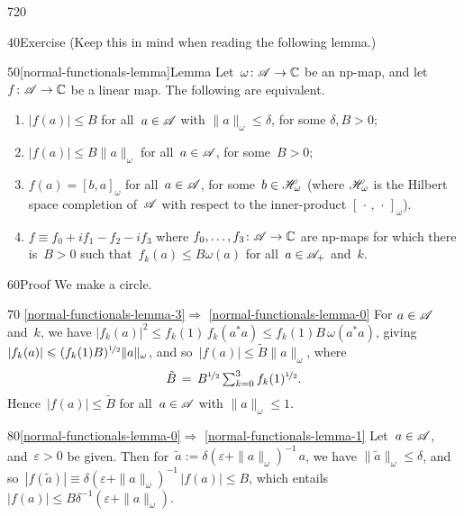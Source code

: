\begin{parsec}{720}
\begin{point}{40}{Exercise}
(Keep this in mind when reading the following lemma.)
\end{point}
\begin{point}{50}[normal-functionals-lemma]{Lemma}%
Let~$\omega\colon \scrA\to\C$ be an np-map,
and let~$f\colon \scrA\to \C$ be a linear map.
The following are equivalent.
\begin{enumerate}
\item\label{normal-functionals-lemma-0}
$\left|f(a)\right|\leq B$ for all~$a\in \scrA$
with $\|a\|_\omega\leq \delta$, for some $\delta,B>0$;
\item\label{normal-functionals-lemma-1}
$\left|f(a)\right| \leq B \|a\|_\omega$ for all~$a\in\scrA$,
for some~$B>0$;
\item\label{normal-functionals-lemma-2}
$f(a)=[b,a]_\omega$ for all~$a\in\scrA$, 
for some~$b\in\scrH_\omega$
(where $\scrH_\omega$ is the Hilbert space completion of~$\scrA$
with respect to the inner-product
$[\,\cdot\,,\,\cdot\,]_\omega$).
\item\label{normal-functionals-lemma-3}
$f\equiv f_0+if_1-f_2-if_3$
where $f_0,\dotsc,f_3\colon \scrA\to \C$
are np-maps for which there is~$B>0$
such that~$f_k(a)\leq B \omega(a)$ for all~$a\in\pos{\scrA}$ 
and~$k$. 
\end{enumerate}%
\spacingfix%
\begin{point}{60}{Proof}%
We make a circle.
\begin{point}{70}{%
\ref{normal-functionals-lemma-3}$\Longrightarrow$%
\ref{normal-functionals-lemma-0}}%
For $a\in \scrA$ and~$k$, we have
$\left|f_k(a)\right|^2 \leq
f_k(1)\,f_k(a^*a) \leq f_k(1)B \,\omega(a^*a)$,
giving~$\left|f_k(a)\right| \leq (f_k(1)B)^{\nicefrac{1}{2}} \|a\|_\omega$,
and so~$\left|f(a)\right|\leq \tilde{B} \|a\|_\omega$,
where 
\begin{equation*}
	\textstyle
	\tilde{B} \,=\, B^{\nicefrac{1}{2}}\sum_{k=0}^3f_k(1)^{\nicefrac{1}{2}}.
\end{equation*}
Hence~$\left|f(a)\right|\leq \tilde{B}$
for all~$a\in\scrA$ with $\|a\|_\omega\leq 1$.
\end{point}
\begin{point}{80}{\ref{normal-functionals-lemma-0}$\Longrightarrow$%
\ref{normal-functionals-lemma-1}}%
Let~$a\in\scrA$, and~$\varepsilon>0$ be given.
Then for~$\tilde{a}:=\delta(\varepsilon+\|a\|_\omega)^{-1}\,a$,
we have $\|\tilde{a}\|_\omega\leq \delta$,
and so~$\left|f(\tilde{a})\right|
\equiv \delta(\varepsilon +\|a\|_\omega)^{-1} \,\left|f(a)\right|
\leq B$,
which entails $\left|f(a)\right|\leq 
B\delta^{-1}(\varepsilon+\|a\|_\omega)$.

\end{point}
\end{point}
\end{point}
\end{parsec}
